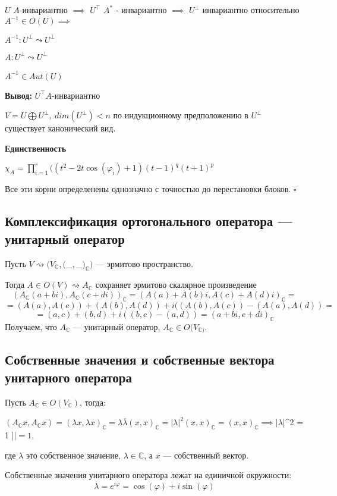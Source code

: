 \documentclass[12pt]{article}
\begin{document}
$U$ $A$-инвариантно $\implies$ $U^\top$  $A^*$ - инвариантно $\implies$ $U^\perp$ инвариантно относительно $A^{-1} \in O(U) \implies$

$A^{-1}: U^\perp \leadsto U^\perp$

$A : U^\perp \leadsto U^\perp $\

$A^{-1} \in Aut(U)$

\textbf{Вывод:} $U^\top A$-инвариантно

$V = U \bigoplus U^\perp, \ dim(U^\perp) <n$ по индукционному предположению в $U^\perp$ существует канонический вид.

\textbf{Единственность}

$\chi_A = \prod^r_{i = 1} ((t^2 - 2t\cos(\varphi_i) + 1)(t-1)^q(t+1)^p$

Все эти корни определенены однозначно с точностью до перестановки блоков. $\square$

\subsection{Комплексификация
 ортогонального оператора — унитарный оператор}
 
Пусть $V \rightsquigarrow (V_\mathbb{C}, ($_$,$_$)_\mathbb{C})$ — эрмитово пространство.

Тогда $A \in O(V) \rightsquigarrow A_\mathbb{C} $ сохраняет эрмитово скалярное произведение
\[
(A_\mathbb{C}(a+bi),A_\mathbb{C}(c+di))_\mathbb{C} = (A(a) + A(b)i, A(c) + A(d)i)_\mathbb{C} = 
\]
\[= (A(a), A(c)) + (A(b), A(d)) + i((A(b), A(c))-(A(a),A(d)) =
\]
\[
= (a,c) + (b,d) + i((b,c) - (a,d)) = (a+bi, c+di)_\mathbb{C}
\]
Получаем, что $A_\mathbb{C}$ — унитарный оператор, $A_\mathbb{C} \in O(V_\mathbb{C)}$.

\subsection{Собственные значения и собственные вектора
 унитарного оператора}
Пусть $A_\mathbb{C} \in O(V_\mathbb{C})$, тогда: 

$(A_\mathbb{C}x,A_\mathbb{C}x) = (\lambda x,\lambda x)_\mathbb{C}= \lambda \overline{\lambda}(x,x)_\mathbb{C}= |\lambda|^2(x,x)_\mathbb{C}= (x,x)_\mathbb{C} \implies |\lambda$|^2 = 1 \implies |\lambda$| = 1,$

где $\lambda$ это собственное значение, $\lambda \in \mathbb{C}$, а $x$ — собственный вектор.

Собственные значения унитарного оператора лежат на единичной окружности:
$$\lambda = e^{i\varphi} = \cos(\varphi) + i\sin(\varphi)$$
\end{document}
